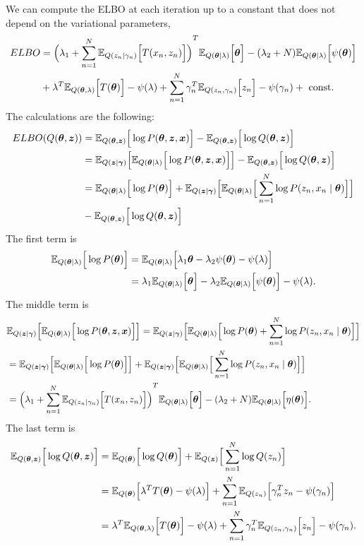 We can compute the ELBO at each iteration up to a constant that does not depend on the variational parameters,
\[
  \begin{aligned}
    ELBO &= {\Big( \lambda_{1} + \sum_{n=1}^{N} \mathbb{E}_{Q(z_{n}\mid \gamma_{n})}\Big[T(x_{n},z_{n})\Big]\Big)}^{T}\mathbb{E}_{Q(\bm{\theta} \mid \lambda)}\Big[\bm{\theta}\Big] - (\lambda_{2} + N) \mathbb{E}_{Q(\bm{\theta} \mid \lambda)}\Big[\psi(\bm{\theta})\Big]\\
    &+ \lambda ^{T} \mathbb{E}_{Q(\bm{\theta}, \lambda)}\Big[T(\bm{\theta})\Big] - \psi(\lambda) + \sum_{n=1}^{N}\gamma_{n}^{T}\mathbb{E}_{Q(z_{n}, \gamma_{n})}\Big[z_{n}\Big] - \psi(\gamma_{n}) + \text{ const. }
  \end{aligned}
\]
The calculations are the following:
\[
  \begin{aligned}
   ELBO(Q(\bm{\theta}, \bm{z})) &= \mathbb{E}_{Q(\bm{\theta}, \bm{z})}\Big[\log{P(\bm{\theta}, \bm{z}, \bm{x})}\Big] - \mathbb{E}_{Q(\bm{\theta}, \bm{z})}\Big[\log{Q(\bm{\theta}, \bm{z})}\Big]\\
  &= \mathbb{E}_{Q(\bm{z} \mid \bm{\gamma})}\Big[\mathbb{E}_{Q(\bm{\theta} \mid \lambda)}\Big[\log P(\bm{\theta}, \bm{z}, \bm{x})\Big]\Big]- \mathbb{E}_{Q(\bm{\theta}, \bm{z})}\Big[\log{Q(\bm{\theta}, \bm{z})}\Big]\\
  &= \mathbb{E}_{Q(\bm{\theta} \mid \lambda)}\Big[\log P(\bm{\theta})\Big] + \mathbb{E}_{Q(\bm{z} \mid \bm{\gamma})}\Big[\mathbb{E}_{Q(\bm{\theta} \mid \lambda)}\Big[\sum_{n=1}^{N} \log P(z_{n}, x_{n} \mid \bm{\theta})\Big]\Big]\\
  &- \mathbb{E}_{Q(\bm{\theta}, \bm{z})}\Big[\log{Q(\bm{\theta}, \bm{z})}\Big]
  \end{aligned}
\]
The first term is
\[
  \begin{aligned}
  \mathbb{E}_{Q(\bm{\theta} \mid \lambda)}\Big[\log P(\bm{\theta})\Big] &=  \mathbb{E}_{Q(\bm{\theta} \mid \lambda)}\Big[ \lambda_{1}\bm{\theta} - \lambda_{2}\psi(\bm{\theta}) - \psi(\lambda) \Big]\\
  &= \lambda_{1}  \mathbb{E}_{Q(\bm{\theta} \mid \lambda)}\Big[\bm{\theta}\Big] - \lambda_{2}\mathbb{E}_{Q(\bm{\theta} \mid \lambda)}\Big[\psi(\bm{\theta})\Big] - \psi(\lambda).
  \end{aligned}
\]
The middle term is 
\[
 \begin{aligned}
    &\mathbb{E}_{Q(\bm{z} \mid \bm{\gamma})}\Big[\mathbb{E}_{Q(\bm{\theta} \mid \lambda)}\Big[\log P(\bm{\theta}, \bm{z}, \bm{x})\Big]\Big] =  \mathbb{E}_{Q(\bm{z} \mid \bm{\gamma})}\Big[\mathbb{E}_{Q(\bm{\theta} \mid \lambda)}\Big[\log P(\bm{\theta}) + \sum_{n=1}^{N} \log P(z_{n}, x_{n} \mid \bm{\theta})\Big]\Big]\\
    &= \mathbb{E}_{Q(\bm{z} \mid \bm{\gamma})}\Big[\mathbb{E}_{Q(\bm{\theta} \mid \lambda)}\Big[\log P(\bm{\theta})\Big]\Big] + \mathbb{E}_{Q(\bm{z} \mid \bm{\gamma})}\Big[\mathbb{E}_{Q(\bm{\theta} \mid \lambda)}\Big[\sum_{n=1}^{N} \log P(z_{n}, x_{n} \mid \bm{\theta})\Big]\Big]\\
    &= {\Big( \lambda_{1} + \sum_{n=1}^{N} \mathbb{E}_{Q(z_{n}\mid \gamma_{n})}\Big[T(x_{n},z_{n})\Big]\Big)}^{T}\mathbb{E}_{Q(\bm{\theta} \mid \lambda)}\Big[\bm{\theta}\Big] - (\lambda_{2} + N) \mathbb{E}_{Q(\bm{\theta} \mid \lambda)}\Big[\eta(\bm{\theta})\Big].
 \end{aligned}
\]
The last term is
\[
  \begin{aligned}
  \mathbb{E}_{Q(\bm{\theta}, \bm{z})}\Big[\log{Q(\bm{\theta}, \bm{z})}\Big]  &= \mathbb{E}_{Q(\bm{\theta})}\Big[\log Q(\bm{\theta})\Big] +  \mathbb{E}_{Q(\bm{z})}\Big[ \sum_{n=1}^{N} \log Q(z_{n})\Big]\\
  &= \mathbb{E}_{Q(\bm{\theta})}\Big[\lambda^{T}T(\bm{\theta}) - \psi(\lambda)\Big] + \sum_{n=1}^{N} \mathbb{E}_{Q(z_{n})}\Big[\gamma_{n}^{T}z_{n} - \psi(\gamma_{n})\Big]\\
  &= \lambda ^{T} \mathbb{E}_{Q(\bm{\theta}, \lambda)}\Big[T(\bm{\theta})\Big] - \psi(\lambda) + \sum_{n=1}^{N}\gamma_{n}^{T}\mathbb{E}_{Q(z_{n}, \gamma_{n})}\Big[z_{n}\Big] - \psi(\gamma_{n}).
  \end{aligned}
\]

